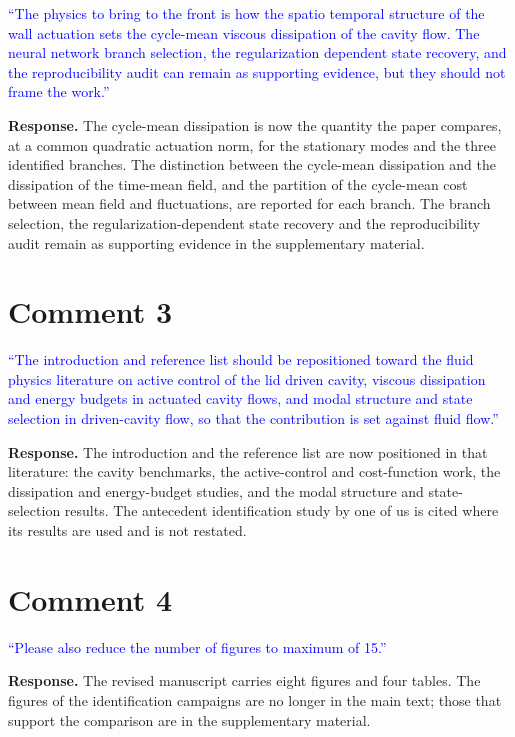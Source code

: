 \documentclass[11pt,a4paper]{article}
\begin{document}
\noindent\textcolor{blue}{``The physics to bring to the front is how the spatio
temporal structure of the wall actuation sets the cycle-mean viscous
dissipation of the cavity flow. The neural network branch selection, the
regularization dependent state recovery, and the reproducibility audit can
remain as supporting evidence, but they should not frame the work.''}

\textbf{Response.} The cycle-mean dissipation is now the quantity the paper
compares, at a common quadratic actuation norm, for the stationary modes and
the three identified branches. The distinction between the cycle-mean
dissipation and the dissipation of the time-mean field, and the partition of
the cycle-mean cost between mean field and fluctuations, are reported for each
branch. The branch selection, the regularization-dependent state recovery and
the reproducibility audit remain as supporting evidence in the supplementary
material.

\section*{Comment 3}

\noindent\textcolor{blue}{``The introduction and reference list should be
repositioned toward the fluid physics literature on active control of the lid
driven cavity, viscous dissipation and energy budgets in actuated cavity
flows, and modal structure and state selection in driven-cavity flow, so that
the contribution is set against fluid flow.''}

\textbf{Response.} The introduction and the reference list are now positioned
in that literature: the cavity benchmarks, the active-control and
cost-function work, the dissipation and energy-budget studies, and the modal
structure and state-selection results. The antecedent identification study by
one of us is cited where its results are used and is not restated.

\section*{Comment 4}

\noindent\textcolor{blue}{``Please also reduce the number of figures to maximum
of 15.''}

\textbf{Response.} The revised manuscript carries eight figures and four
tables. The figures of the identification campaigns are no longer in the main
text; those that support the comparison are in the supplementary material.
\end{document}
